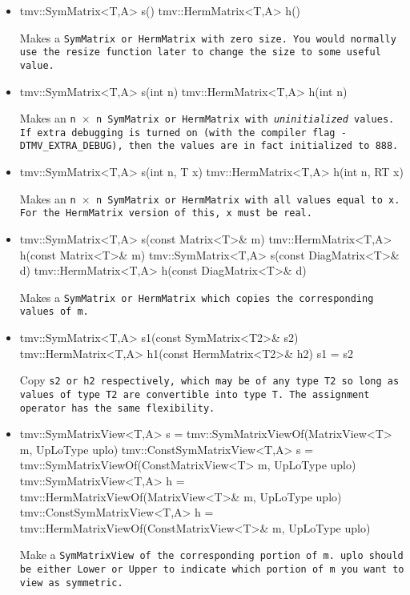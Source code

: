 \begin{itemize}

\item
\begin{tmvcode}
tmv::SymMatrix<T,A> s()
tmv::HermMatrix<T,A> h()
\end{tmvcode}
Makes a \tt{SymMatrix} or \tt{HermMatrix} with zero size.  You would normally use the \tt{resize} function later to
change the size to some useful value.

\item 
\begin{tmvcode}
tmv::SymMatrix<T,A> s(int n)
tmv::HermMatrix<T,A> h(int n)
\end{tmvcode}
Makes an \tt{n} $\times$ \tt{n} \tt{SymMatrix} or \tt{HermMatrix}
with {\em uninitialized} values.
If extra debugging is turned on (with the compiler flag \tt{-DTMV\_EXTRA\_DEBUG}), then the values are in fact initialized to 888.  

\item
\begin{tmvcode}
tmv::SymMatrix<T,A> s(int n, T x)
tmv::HermMatrix<T,A> h(int n, RT x)
\end{tmvcode}
Makes an \tt{n} $\times$ \tt{n} \tt{SymMatrix} or \tt{HermMatrix} 
with all values equal to \tt{x}.
For the \tt{HermMatrix} version of this, \tt{x} must be real.

\item 
\begin{tmvcode}
tmv::SymMatrix<T,A> s(const Matrix<T>& m)
tmv::HermMatrix<T,A> h(const Matrix<T>& m)
tmv::SymMatrix<T,A> s(const DiagMatrix<T>& d)
tmv::HermMatrix<T,A> h(const DiagMatrix<T>& d)
\end{tmvcode}
Makes a \tt{SymMatrix} or \tt{HermMatrix} which copies the corresponding values of \tt{m}.

\item
\begin{tmvcode}
tmv::SymMatrix<T,A> s1(const SymMatrix<T2>& s2)
tmv::HermMatrix<T,A> h1(const HermMatrix<T2>& h2)
s1 = s2
\end{tmvcode}
Copy \tt{s2} or \tt{h2} respectively, which may be of any type \tt{T2} so long
as values of type \tt{T2} are convertible into type \tt{T}.
The assignment operator has the same flexibility.

\item
\begin{tmvcode}
tmv::SymMatrixView<T,A> s = 
      tmv::SymMatrixViewOf(MatrixView<T> m, UpLoType uplo)
tmv::ConstSymMatrixView<T,A> s = 
      tmv::SymMatrixViewOf(ConstMatrixView<T> m, UpLoType uplo)
tmv::SymMatrixView<T,A> h = 
      tmv::HermMatrixViewOf(MatrixView<T>& m, UpLoType uplo)
tmv::ConstSymMatrixView<T,A> h = 
      tmv::HermMatrixViewOf(ConstMatrixView<T>& m, UpLoType uplo)
\end{tmvcode}
Make a \tt{SymMatrixView} of the corresponding portion of \tt{m}.
\tt{uplo} should be either \tt{Lower} or \tt{Upper} to indicate which
portion of \tt{m} you want to view as symmetric.


\end{itemize}
